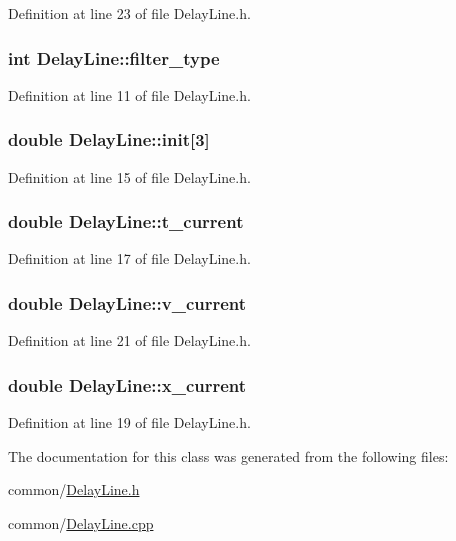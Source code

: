 Definition at line 23 of file DelayLine.h.

\hypertarget{classDelayLine_a86b4adda2792d346ee78b59a3e26992a}{
\subsubsection[{filter\_\-type}]{\setlength{\rightskip}{0pt plus 5cm}int {\bf DelayLine::filter\_\-type}}}
\label{classDelayLine_a86b4adda2792d346ee78b59a3e26992a}


Definition at line 11 of file DelayLine.h.

\hypertarget{classDelayLine_a998ede89f80499652d8f1da052fc90de}{
\subsubsection[{init}]{\setlength{\rightskip}{0pt plus 5cm}double {\bf DelayLine::init}\mbox{[}3\mbox{]}}}
\label{classDelayLine_a998ede89f80499652d8f1da052fc90de}


Definition at line 15 of file DelayLine.h.

\hypertarget{classDelayLine_ae46cf8249f9040270c5ffb1289e5f760}{
\subsubsection[{t\_\-current}]{\setlength{\rightskip}{0pt plus 5cm}double {\bf DelayLine::t\_\-current}}}
\label{classDelayLine_ae46cf8249f9040270c5ffb1289e5f760}


Definition at line 17 of file DelayLine.h.

\hypertarget{classDelayLine_a4d51575ded15097f1a837d3ceeaf6bec}{
\subsubsection[{v\_\-current}]{\setlength{\rightskip}{0pt plus 5cm}double {\bf DelayLine::v\_\-current}}}
\label{classDelayLine_a4d51575ded15097f1a837d3ceeaf6bec}


Definition at line 21 of file DelayLine.h.

\hypertarget{classDelayLine_a36cd2a92c561630bbaa6646f23a00626}{
\subsubsection[{x\_\-current}]{\setlength{\rightskip}{0pt plus 5cm}double {\bf DelayLine::x\_\-current}}}
\label{classDelayLine_a36cd2a92c561630bbaa6646f23a00626}


Definition at line 19 of file DelayLine.h.



The documentation for this class was generated from the following files:\begin{DoxyCompactItemize}
\item 
common/\hyperlink{DelayLine_8h}{DelayLine.h}\item 
common/\hyperlink{DelayLine_8cpp}{DelayLine.cpp}\end{DoxyCompactItemize}
